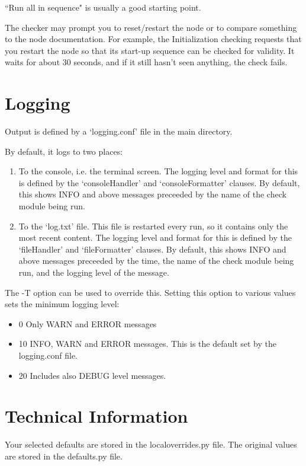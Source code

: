 ``Run all in sequence" is usually a good starting point.

The checker may prompt you to reset/restart the node or to
compare something to the node documentation. For example,
the Initialization checking requests that you restart the node
so that its start-up sequence can be checked for validity.
It waits for about 30 seconds, and if it still hasn't seen anything, the
check fails.

\section{Logging}

Output is defined by a `logging.conf' file in the main directory.

By default, it logs to two places:
\begin{enumerate}
\item To the console, i.e. the terminal screen.  The logging level and format
for this is defined by the `consoleHandler' and `consoleFormatter' clauses.
By default, this shows INFO and above messages preceeded by the name of the 
check module being run.
\item To the `log.txt' file. This file is restarted every run, so it 
contains only the most recent content. The logging level and format
for this is defined by the `fileHandler' and `fileFormatter' clauses.
By default, this shows INFO and above messages preceeded by the 
time, the name of the check module being run, and the logging level of the message.
\end{enumerate}

The -T option can be used to override this.  Setting this option to
various values sets the minimum logging level:
\begin{itemize}
\item 0 Only WARN and ERROR messages
\item 10 INFO, WARN and ERROR messages.  This is the default set by the logging.conf file.
\item 20 Includes also DEBUG level messages.
\end{itemize}

\section{Technical Information}

Your selected defaults are stored in the localoverrides.py file.
The original values are stored in the defaults.py file.

